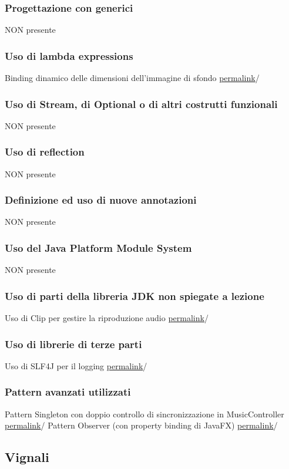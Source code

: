 \documentclass[a4paper,12pt]{report}
\begin{document}
\subsubsection{Progettazione con generici}
NON presente
\subsubsection{Uso di lambda expressions}
Binding dinamico delle dimensioni dell'immagine di sfondo \href{https://google.com}{permalink}/ 
\subsubsection{Uso di Stream, di Optional o di altri costrutti funzionali}
NON presente
\subsubsection{Uso di reflection}	
NON presente
\subsubsection{Definizione ed uso di nuove annotazioni}
NON presente
\subsubsection{Uso del Java Platform Module System}
NON presente
\subsubsection{Uso di parti della libreria JDK non spiegate a lezione}
Uso di Clip per gestire la riproduzione audio \href{https://google.com}{permalink}/
\subsubsection{Uso di librerie di terze parti}
Uso di SLF4J per il logging \href{https://google.com}{permalink}/
\subsubsection{Pattern avanzati utilizzati}
Pattern Singleton con doppio controllo di sincronizzazione in MusicController \href{https://google.com}{permalink}/
Pattern Observer (con property binding di JavaFX)  \href{https://google.com}{permalink}/

\subsection{Vignali}
\end{document}
